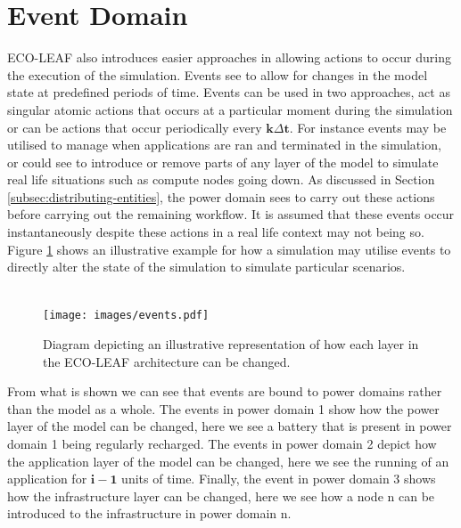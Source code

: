 \documentclass{l4proj}
\begin{document}
\section{Event Domain}\label{sec:events}
ECO-LEAF also introduces easier approaches in allowing actions to occur during the execution of the simulation.
Events see to allow for changes in the model state at predefined periods of time.
Events can be used in two approaches, act as singular atomic actions that occurs at a particular moment during the simulation or can be actions that occur periodically every $\mathbf{k\varDelta t}$.
For instance events may be utilised to manage when applications are ran and terminated in the simulation, or could see to introduce or remove parts of any layer of the model to simulate real life situations such as compute nodes going down.
As discussed in Section \ref{subsec:distributing-entities}, the power domain sees to carry out these actions before carrying out the remaining workflow.
It is assumed that these events occur instantaneously despite these actions in a real life context may not being so.
Figure \ref{fig:events} shows an illustrative example for how a simulation may utilise events to directly alter the state of the simulation to simulate particular scenarios.\\ \\
\begin{figure}[h]
    \centering
    \texttt{[image: images/events.pdf]}
    ~
    \caption{Diagram depicting an illustrative representation of how each layer in the ECO-LEAF architecture can be changed.}
    \label{fig:events}
\end{figure}
From what is shown we can see that events are bound to power domains rather than the model as a whole.
The events in power domain 1 show how the power layer of the model can be changed, here we see a battery that is present in power domain 1 being regularly recharged.
The events in power domain 2 depict how the application layer of the model can be changed, here we see the running of an application for $\mathbf{i - 1}$ units of time.
Finally, the event in power domain 3 shows how the infrastructure layer can be changed, here we see how a node n can be introduced to the infrastructure in power domain n.
\end{document}

